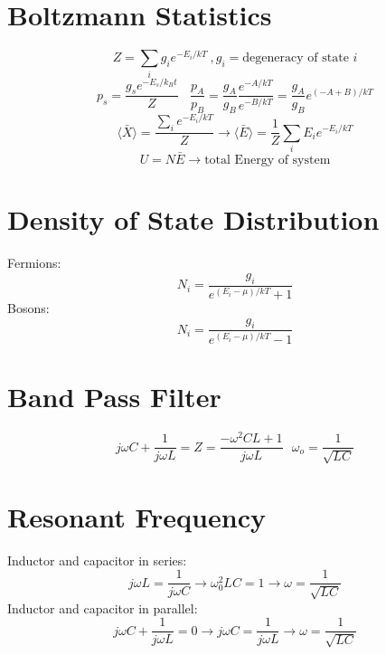 \documentclass[10pt,letter]{article}
\begin{document}
\section{Boltzmann Statistics} %
\label{sec:boltzmann_statistics}
\begin{equation}
    Z = \sum \limits_i g_i e^{-E_i/kT}~, g_i = \textrm{degeneracy of state } i
\end{equation}
\begin{equation}
    p_s = \frac{g_s e^{-E_s/k_B t}}{Z} ~~~~ \frac{p_A}{p_B} = \frac{g_A}{g_B} \frac{e^{-A/kT}}{e^{-B/kT}} = \frac{g_A}{g_B} e^{(-A + B)/kT}
\end{equation}
\begin{equation}
    \langle \bar{X} \rangle = \frac{\sum \limits_i e^{-E_i/kT}}{Z} \rightarrow \langle\bar{E} \rangle =  \frac{1}{Z} \sum \limits_i E_i e^{-E_i/kT}
\end{equation}
\begin{equation}
    U = N \bar{E} \rightarrow \textrm{total Energy of system}
\end{equation}

\section{Density of State Distribution} %
\label{sec:density_of_state_distribution}
Fermions: 
\begin{equation}
    N_i = \frac{g_i}{e^{(E_i - \mu)/kT} + 1}
\end{equation}
Bosons:
\begin{equation}
    N_i = \frac{g_i}{ e^{(E_i - \mu)/kT } - 1}
\end{equation}

\section{Band Pass Filter} %
\label{sec:band_pass_filter}
\begin{equation}
    j\omega C + \frac{1}{j\omega L} = Z = \frac{-\omega^2 C L + 1}{j \omega L}~~~ \omega_o = \frac{1}{\sqrt{LC}}
\end{equation}

\section{Resonant Frequency} %
\label{sec:resonant_frequency}
Inductor and capacitor in series:
\begin{equation}
    j \omega L = \frac{1}{j \omega C} \rightarrow \omega_0^2 LC = 1 \rightarrow \omega = \frac{1}{\sqrt{LC}}
\end{equation}
Inductor and capacitor in parallel:
\begin{equation}
    j\omega C + \frac{1}{j \omega L} = 0 \rightarrow j \omega C = \frac{1}{j \omega L} \rightarrow \omega = \frac{1}{\sqrt{LC}}
\end{equation}
\end{document}

